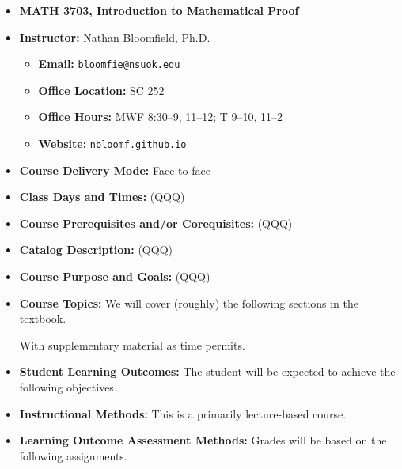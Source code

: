\documentclass{article}
\begin{document}
\begin{itemize}
\item[] \textbf{\Large MATH 3703, Introduction to Mathematical Proof}

\item \textbf{Instructor:} Nathan Bloomfield, Ph.D.
\begin{itemize}
\item[] \textbf{Email:} \texttt{bloomfie@nsuok.edu}
\item[] \textbf{Office Location:} SC 252 
\item[] \textbf{Office Hours:} MWF 8:30--9, 11--12; T 9--10, 11--2
\item[] \textbf{Website:} \texttt{nbloomf.github.io}
\end{itemize}


\item \textbf{Course Delivery Mode:} Face-to-face


\item \textbf{Class Days and Times:} (QQQ)


\item \textbf{Course Prerequisites and/or Corequisites:} (QQQ)


\item \textbf{Catalog Description:} (QQQ)


\item \textbf{Course Purpose and Goals:} (QQQ)


\item \textbf{Course Topics:} We will cover (roughly) the following sections in the textbook.
With supplementary material as time permits.


\item \textbf{Student Learning Outcomes:} The student will be expected to achieve the following objectives.


\item \textbf{Instructional Methods:} This is a primarily lecture-based course.


\item \textbf{Learning Outcome Assessment Methods:} Grades will be based on the following assignments.


\end{itemize}
\end{document}

